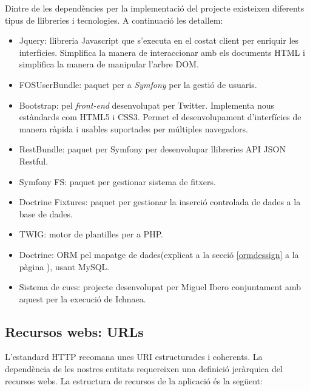 Dintre de les dependències per la implementació del projecte existeixen diferents tipus de llibreries i tecnologies. A continuació les detallem:
\begin{itemize}
\item Jquery: llibreria Javascript que s'executa en el costat client per enriquir les interfícies.\cite{jquery} Simplifica la manera de interaccionar amb els documents HTML\cite{html} i simplifica la manera de manipular l'arbre DOM.\cite{dom}
\item FOSUserBundle: paquet per a \textit{Symfony} per la gesti\'{o} de usuaris.\cite{fosuserbundle}
\item Bootstrap:  pel \textit{front-end} desenvolupat per Twitter. Implementa nous estàndards com HTML5\cite{html5} i CSS3\cite{css3}. Permet el desenvolupament d'interf\'{i}cies de manera r\`{a}pida i usables suportades per múltiples navegadors.
\item RestBundle: paquet per Symfony per desenvolupar llibreries API JSON Restful.\cite{apijson}
\item Symfony FS: paquet per gestionar sistema de fitxers.
\item Doctrine Fixtures: paquet per gestionar la inserci\'{o} controlada de dades a la base de dades.
\item TWIG: motor de plantilles per a PHP.\cite{twig}
\item Doctrine: ORM pel mapatge de dades(explicat a la secció \ref{ormdessign} a la p\`{a}gina \pageref{ormdessign}), usant MySQL.\cite{mysql}
\item Sistema de cues: projecte desenvolupat per Miguel Ibero conjuntament amb aquest per la execució de Ichnaea.
\end{itemize}

\subsection{Recursos webs: URLs}
L'estandard HTTP recomana unes URI estructurades i coherents.\cite{rfc3986} La dependència de les nostres entitats requereixen una definició jeràrquica del recursos webs. La estructura de recursos de la aplicaci\'{o} \'{e}s la següent:\\

